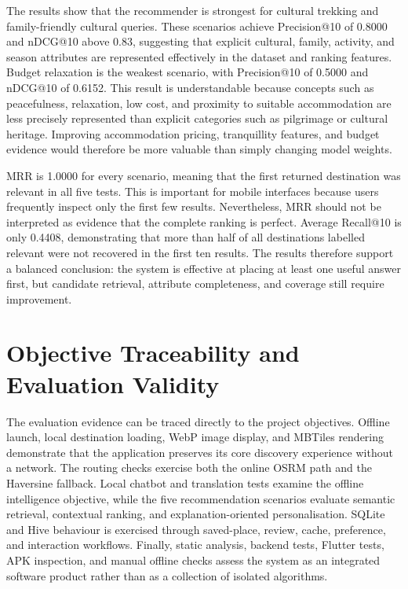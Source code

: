 \documentclass[12pt,a4paper,oneside]{report}
\begin{document}
The results show that the recommender is strongest for cultural trekking and family-friendly cultural queries. These scenarios achieve Precision@10 of 0.8000 and nDCG@10 above 0.83, suggesting that explicit cultural, family, activity, and season attributes are represented effectively in the dataset and ranking features. Budget relaxation is the weakest scenario, with Precision@10 of 0.5000 and nDCG@10 of 0.6152. This result is understandable because concepts such as peacefulness, relaxation, low cost, and proximity to suitable accommodation are less precisely represented than explicit categories such as pilgrimage or cultural heritage. Improving accommodation pricing, tranquillity features, and budget evidence would therefore be more valuable than simply changing model weights.

MRR is 1.0000 for every scenario, meaning that the first returned destination was relevant in all five tests. This is important for mobile interfaces because users frequently inspect only the first few results. Nevertheless, MRR should not be interpreted as evidence that the complete ranking is perfect. Average Recall@10 is only 0.4408, demonstrating that more than half of all destinations labelled relevant were not recovered in the first ten results. The results therefore support a balanced conclusion: the system is effective at placing at least one useful answer first, but candidate retrieval, attribute completeness, and coverage still require improvement.

\section{Objective Traceability and Evaluation Validity}
\label{sec:validity}

The evaluation evidence can be traced directly to the project objectives. Offline launch, local destination loading, WebP image display, and MBTiles rendering demonstrate that the application preserves its core discovery experience without a network. The routing checks exercise both the online OSRM path and the Haversine fallback. Local chatbot and translation tests examine the offline intelligence objective, while the five recommendation scenarios evaluate semantic retrieval, contextual ranking, and explanation-oriented personalisation. SQLite and Hive behaviour is exercised through saved-place, review, cache, preference, and interaction workflows. Finally, static analysis, backend tests, Flutter tests, APK inspection, and manual offline checks assess the system as an integrated software product rather than as a collection of isolated algorithms.
\end{document}
